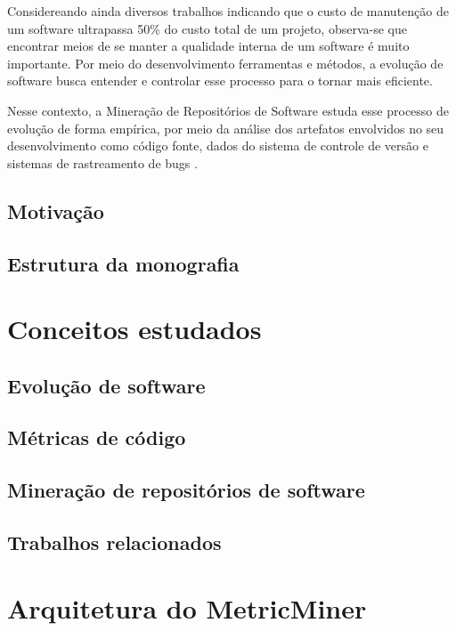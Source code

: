 \documentclass[a4paper, 12pt, twoside]{book}
\begin{document}
        Considereando ainda diversos trabalhos indicando que o custo de manutenção de um software 
        ultrapassa 50\% do custo total de um projeto, observa-se que encontrar meios de se
        manter a qualidade interna de um software é muito importante. Por meio do desenvolvimento 
        ferramentas e métodos, a evolução de software busca entender e controlar esse processo
        para o tornar mais eficiente.
        
        Nesse contexto, a Mineração de Repositórios de Software estuda esse processo de evolução de forma empírica, 
        por meio da análise dos artefatos envolvidos no seu desenvolvimento como código fonte, dados do sistema de
        controle de versão e sistemas de rastreamento de bugs \cite{Kagdi:2007}. 

    \section{Motivação}
    
    \section{Estrutura da monografia}

    
\chapter{Conceitos estudados}

    \section{Evolução de software}
    
    \section{Métricas de código}
    
    \section{Mineração de repositórios de software}

    \section{Trabalhos relacionados}
    
\chapter{Arquitetura do MetricMiner}
\end{document}
